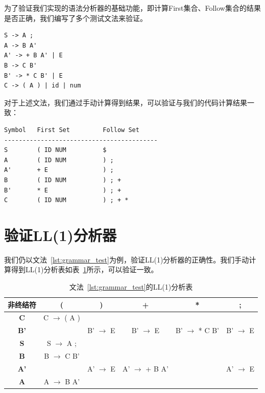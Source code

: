 \documentclass[UTF8,openany]{ctexbook}
\begin{document}
为了验证我们实现的语法分析器的基础功能，即计算First集合、Follow集合的结果是否正确，我们编写了多个测试文法来验证。

\begin{lstlisting}[caption={测试文法},label={lst:grammar_test}]
S -> A ;
A -> B A'
A' -> + B A' | E
B -> C B'
B' -> * C B' | E
C -> ( A ) | id | num
\end{lstlisting}

对于上述文法，我们通过手动计算得到结果，可以验证与我们的代码计算结果一致：

\begin{lstlisting}[caption={First集与Follow集},label={lst:first_follow}]
Symbol   First Set         Follow Set
------------------------------------------
S        ( ID NUM          $
A        ( ID NUM          ) ;
A'       + E               ) ;
B        ( ID NUM          ) ; +
B'       * E               ) ; +
C        ( ID NUM          ) ; + *
\end{lstlisting}

\section{验证LL(1)分析器}

我们仍以文法~\ref{lst:grammar_test}为例，验证LL(1)分析器的正确性。我们手动计算得到LL(1)分析表如表~\ref{tab:parse-table}所示，可以验证一致。

\begin{table}[H]
    \small
    \centering
    \caption{文法~\ref{lst:grammar_test}的LL(1)分析表}
    \label{tab:parse-table}
    \begin{tabular}{|c|c|c|c|c|c|}
        \hline
        \textbf{非终结符} & \textbf{(} & \textbf{)} & \textbf{+} & \textbf{*} & \textbf{;} \\
        \hline
        \textbf{C} & C $\to$ ( A ) & & & & \\
        \hline
        \textbf{B'} & & B' $\to$ E & B' $\to$ E & B' $\to$ * C B' & B' $\to$ E \\
        \hline
        \textbf{S} & S $\to$ A ; & & & & \\
        \hline
        \textbf{B} & B $\to$ C B' & & & & \\
        \hline
        \textbf{A'} & & A' $\to$ E & A' $\to$ + B A' & & A' $\to$ E\\
        \hline
        \textbf{A} & A $\to$ B A' & & & & \\
        \hline
    \end{tabular}
\end{table}
\end{document}
